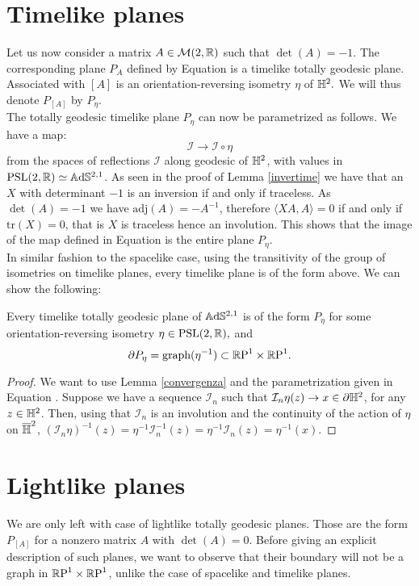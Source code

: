 \section{Timelike planes}
Let us now consider a matrix $A\in\mathcal{M}(2,\mathbb{R})$ such that $\det(A)=-1.$ The corresponding plane $P_A$ defined by Equation  is a timelike totally geodesic plane. Associated with $[A]$ is an orientation-reversing isometry $\eta$ of $\mathbb{H}^2.$ We will thus denote $P_{[A]}$ by $P_\eta$. \\
The totally geodesic timelike plane $P_\eta$ can now be parametrized as follows. We have a map: 
\begin{equation}\label{refspa}
    \mathcal{I}\to\mathcal{I}\circ\eta
\end{equation}
from the spaces of reflections $\mathcal{I}$ along geodesic of $\mathbb{H}^2$, with values in $\text{PSL}(2,\mathbb{R})\simeq\mathbb{A}\mathrm{d}\mathbb{S}^{2,1}$. As seen in the proof of Lemma \ref{invertime} we have that an $X$ with determinant $-1$ is an inversion if and only if traceless. As $\det(A)=-1$ we have $\text{adj}(A)=-A^{-1}$, therefore $\langle XA,A\rangle=0$ if and only if $\text{tr}(X)=0$, that is $X$ is traceless hence an involution. This shows that the image of the map defined in Equation  is the entire plane $P_\eta$.\\  
In similar fashion to the spacelike case, using the transitivity of the group of isometries on timelike planes, every timelike plane is of the form above. We can show the following: 
\begin{lemma}\label{33}
    Every timelike totally geodesic plane of $\mathbb{A}\mathrm{d}\mathbb{S}^{2,1}$ is of the form $P_\eta$ for some orientation-reversing isometry $\eta\in\text{PSL}(2,\mathbb{R}),$ and 
    \[
        \partial P_\eta=\text{graph}(\eta^{-1})\subset\mathbb{R}\text{P}^1\times\mathbb{R}\text{P}^1.
    \]
\end{lemma}
\begin{proof}
    We want to use Lemma \ref{convergenza} and the parametrization given in Equation . Suppose we have a sequence $\mathcal{I}_n$ such that $\mathcal{I}_n\eta(z)\to x\in\partial\mathbb{H}^2$, for any $z\in\mathbb{H}^2$. Then, using that $\mathcal{I}_n$ is an involution and the continuity of the action of $\eta$ on $\overline{\mathbb{H}}^2$, $(\mathcal{I}_n\eta)^{-1}(z)=\eta^{-1}\mathcal{I}_n^{-1}(z)=\eta^{-1}\mathcal{I}_n(z)=\eta^{-1}(x).$ 
\end{proof}

\section{Lightlike planes}
We are only left with case of lightlike totally geodesic planes. Those are the form $P_{[A]}$ for a nonzero matrix $A$ with $\det(A)=0$. Before giving an explicit description of such planes, we want to observe that their boundary will not be a graph in $\mathbb{R}\text{P}^1\times\mathbb{R}\text{P}^1$, unlike the case of spacelike and timelike planes. 

